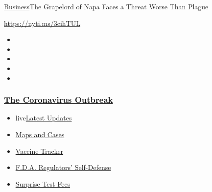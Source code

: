 \href{/section/business}{Business}\textbar{}The Grapelord of Napa Faces
a Threat Worse Than Plague

\url{https://nyti.ms/3cihTUL}

\begin{itemize}
\item
\item
\item
\item
\item
\end{itemize}

\hypertarget{the-coronavirus-outbreak}{%
\subsubsection{\texorpdfstring{\href{https://www.nytimes3xbfgragh.onion/news-event/coronavirus?name=styln-coronavirus-markets\&region=TOP_BANNER\&block=storyline_menu_recirc\&action=click\&pgtype=Article\&impression_id=879e4a20-f52e-11ea-89d9-339d62ecbc9c\&variant=undefined}{The
Coronavirus
Outbreak}}{The Coronavirus Outbreak}}\label{the-coronavirus-outbreak}}

\begin{itemize}
\tightlist
\item
  live\href{https://www.nytimes3xbfgragh.onion/2020/09/12/world/covid-19-coronavirus.html?name=styln-coronavirus-markets\&region=TOP_BANNER\&block=storyline_menu_recirc\&action=click\&pgtype=Article\&impression_id=879e4a21-f52e-11ea-89d9-339d62ecbc9c\&variant=undefined}{Latest
  Updates}
\item
  \href{https://www.nytimes3xbfgragh.onion/interactive/2020/us/coronavirus-us-cases.html?name=styln-coronavirus-markets\&region=TOP_BANNER\&block=storyline_menu_recirc\&action=click\&pgtype=Article\&impression_id=879e4a22-f52e-11ea-89d9-339d62ecbc9c\&variant=undefined}{Maps
  and Cases}
\item
  \href{https://www.nytimes3xbfgragh.onion/interactive/2020/science/coronavirus-vaccine-tracker.html?name=styln-coronavirus-markets\&region=TOP_BANNER\&block=storyline_menu_recirc\&action=click\&pgtype=Article\&impression_id=879e7130-f52e-11ea-89d9-339d62ecbc9c\&variant=undefined}{Vaccine
  Tracker}
\item
  \href{https://www.nytimes3xbfgragh.onion/2020/09/10/us/politics/fda-coronavirus-vaccine.html?name=styln-coronavirus-markets\&region=TOP_BANNER\&block=storyline_menu_recirc\&action=click\&pgtype=Article\&impression_id=879e7131-f52e-11ea-89d9-339d62ecbc9c\&variant=undefined}{F.D.A.
  Regulators' Self-Defense}
\item
  \href{https://www.nytimes3xbfgragh.onion/2020/09/09/upshot/coronavirus-surprise-test-fees.html?name=styln-coronavirus-markets\&region=TOP_BANNER\&block=storyline_menu_recirc\&action=click\&pgtype=Article\&impression_id=879e7132-f52e-11ea-89d9-339d62ecbc9c\&variant=undefined}{Surprise
  Test Fees}
\end{itemize}


